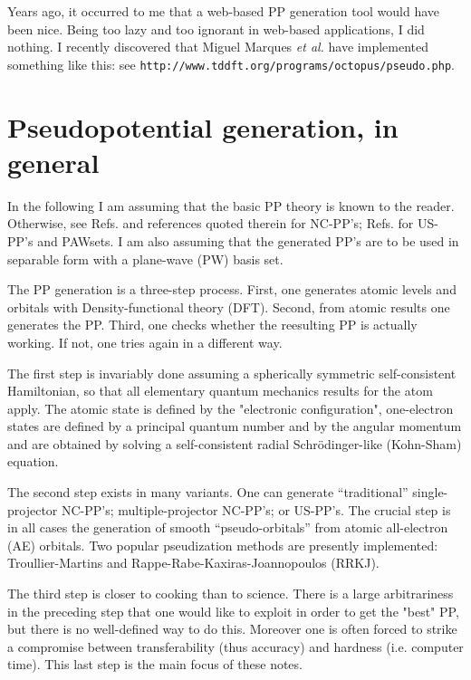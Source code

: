 \documentclass[12pt]{article}
\begin{document}
Years ago, it occurred to me that a web-based PP generation
tool would have been nice. Being too lazy and too ignorant 
in web-based applications, I did nothing.
I recently discovered that Miguel Marques {\em et al.} have
implemented something like this: see
{\tt http://www.tddft.org/programs/octopus/pseudo.php}.

\section{Pseudopotential generation, in general} 

In the following I am assuming that the basic PP theory 
is known to the reader. Otherwise, see 
Refs.\cite{NC,BHS,TM,fhi98PP,RRKJ} and references quoted 
therein for NC-PP's; Refs.\cite{van,PAW} for US-PP's and PAWsets. 
I am also assuming that the generated PP's are to be used
in separable form \cite{KB} with a plane-wave (PW) basis set.

The PP generation is a three-step process. First, one generates
atomic levels and orbitals with Density-functional theory (DFT). 
Second, from atomic results one generates the PP. Third, one checks 
whether the reesulting PP is actually working. If not, one tries again in 
a different way.

The first step is invariably done assuming a spherically symmetric
self-consistent Hamiltonian, so that all elementary quantum mechanics 
results for the atom apply. The atomic state is defined by the
"electronic configuration", one-electron states are defined by a
principal quantum number and by the angular momentum and are obtained
by solving a self-consistent radial Schr\"odinger-like (Kohn-Sham)
equation.

The second step exists in many variants. One can generate ``traditional'' 
single-projector NC-PP's; multiple-projector NC-PP's; or US-PP's.
The crucial step is in all cases the generation of smooth
``pseudo-orbitals''  from atomic all-electron (AE) orbitals. 
Two popular pseudization
methods are presently implemented: Troullier-Martins \cite{TM}
and Rappe-Rabe-Kaxiras-Joannopoulos \cite{RRKJ} (RRKJ).

The third step is closer to cooking than to science. There is a
large arbitrariness in the preceding step that one would like to 
exploit in order to get the "best" PP, but there is no well-defined
way to do this. Moreover one is often forced to strike a compromise
between transferability (thus accuracy) and hardness (i.e. computer 
time). This last step is the main focus of these notes.
\end{document}
